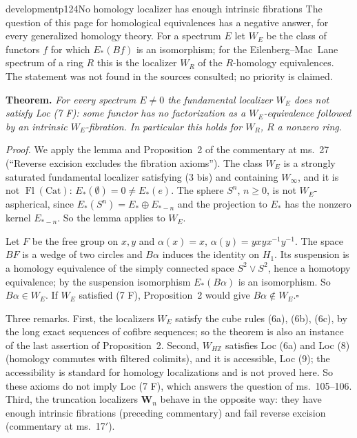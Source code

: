 \begin{dcomment}{development}{p124}{No homology localizer has enough intrinsic fibrations}
The question of this page for homological equivalences has a negative answer, for every generalized homology theory. For a spectrum $E$ let $W_E$ be the class of functors $f$ for which $E_*(Bf)$ is an isomorphism; for the Eilenberg--Mac~Lane spectrum of a ring $R$ this is the localizer $W_R$ of the $R$-homology equivalences. The statement was not found in the sources consulted; no priority is claimed.

\textbf{Theorem.}\ours
\textit{For every spectrum $E\neq0$ the fundamental localizer $W_E$ does not satisfy Loc (7 F): some functor has no factorization as a $W_E$-equivalence followed by an intrinsic $W_E$-fibration. In particular this holds for $W_R$, $R$ a nonzero ring.}

\textit{Proof.}
We apply the lemma and Proposition~2 of the commentary at ms.~27 (``Reverse excision excludes the fibration axioms''). The class $W_E$ is a strongly saturated fundamental localizer satisfying (3 bis) and containing $W_\infty$, and it is not $\operatorname{Fl}(\mathrm{Cat})$: $E_*(\emptyset)=0\neq E_*(e)$. The sphere $S^n$, $n\geq0$, is not $W_E$-aspherical, since $E_*(S^n)=E_*\oplus E_{*-n}$ and the projection to $E_*$ has the nonzero kernel $E_{*-n}$. So the lemma applies to $W_E$.

Let $F$ be the free group on $x,y$ and $\alpha(x)=x$, $\alpha(y)=yxyx^{-1}y^{-1}$. The space $BF$ is a wedge of two circles and $B\alpha$ induces the identity on $H_1$. Its suspension is a homology equivalence of the simply connected space $S^2\vee S^2$, hence a homotopy equivalence; by the suspension isomorphism $E_*(B\alpha)$ is an isomorphism. So $B\alpha\in W_E$. If $W_E$ satisfied (7 F), Proposition~2 would give $B\alpha\notin W_E$.\hfill$\square$

Three remarks. First, the localizers $W_E$ satisfy the cube rules (6a), (6b), (6c), by the long exact sequences of cofibre sequences; so the theorem is also an instance of the last assertion of Proposition~2. Second, $W_{H\mathbb Z}$ satisfies Loc (6a) and Loc (8) (homology commutes with filtered colimits), and it is accessible, Loc (9); the accessibility is standard for homology localizations and is not proved here. So these axioms do not imply Loc (7 F), which answers the question of ms.~105--106. Third, the truncation localizers $\mathbf W_n$ behave in the opposite way: they have enough intrinsic fibrations (preceding commentary) and fail reverse excision (commentary at ms.~17$'$).
\end{dcomment}
